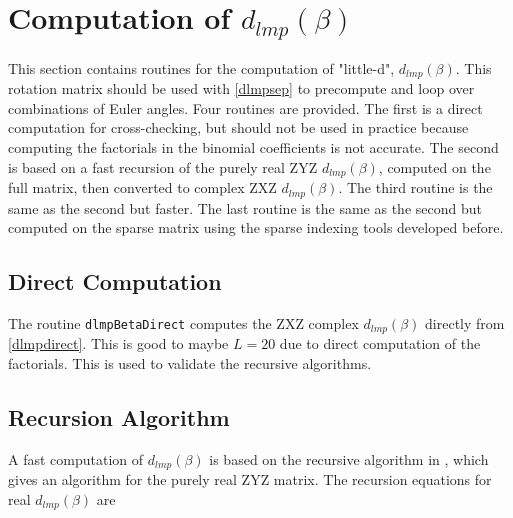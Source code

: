 {\footnotesize
{}
}


{\footnotesize
{}
}


{\footnotesize
{}
}


\newpage

\section{Computation of $d_{lmp}(\beta)$}
\label{littled}
This section contains routines for the computation of "little-d", $d_{lmp}(\beta)$. This rotation matrix should be used with \eqref{dlmpsep} to precompute and loop over combinations of Euler angles.  Four routines are provided. The first is a direct computation for cross-checking, but should not be used in practice because computing the factorials in the binomial coefficients is not accurate. The second is based on a fast recursion of the purely real ZYZ $d_{lmp}(\beta)$, computed on the full matrix, then converted to complex ZXZ $d_{lmp}(\beta)$.  The third routine is the same as the second but faster. The last routine is the same as the second but computed on the sparse matrix using the sparse indexing tools developed before. 


\subsection{Direct Computation}

The routine \texttt{dlmpBetaDirect} computes the ZXZ complex $d_{lmp}(\beta)$ directly from \eqref{dlmpdirect}. This is good to maybe $L = 20$ due to direct computation of the factorials. This is used to validate the recursive algorithms.

{\footnotesize
{}
}

\subsection{Recursion Algorithm}

A fast computation of $d_{lmp}(\beta)$ is based on the recursive algorithm in \cite{gimbutas2009fast}, which gives an algorithm for the purely real ZYZ matrix. The recursion equations for real $d_{lmp}(\beta)$ are 
 
